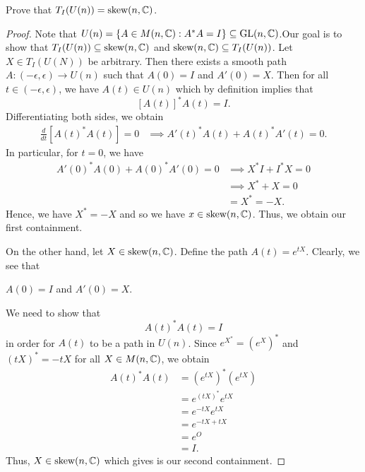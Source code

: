 \documentclass{article}
\begin{document}
\begin{problem}
    Prove that \( {T}_{I}(U(n))  = \text{skew}(n,\mathbb{C}) \).
\end{problem}
\begin{proof}
Note that \( U(n) = \{  A \in M(n,\mathbb{C}) : A^{*} A = I   \} \subseteq \text{GL}(n,\mathbb{C})    \).Our goal is to show that \( {T}_{I}(U(n)) \subseteq \text{skew}(n,\mathbb{C})  \) and \( \text{skew}(n,\mathbb{C}) \subseteq {T}_{I}(U(n))  \). Let \( X \in {T}_{I}(U(N)) \) be arbitrary. Then there exists a smooth path \( A : (- \epsilon, \epsilon) \to U(n) \) such that \( A(0) = I  \) and \( A'(0) = X  \). Then for all \( t \in (- \epsilon , \epsilon ) \), we have \( A(t) \in U(n) \) which by definition implies that 
\[  [A(t)]^{*}  A(t) = I.  \]
Differentiating both sides, we obtain
\begin{align*}
    \frac{ d }{ dt  } [A(t)^{*} A(t)] = 0 &\implies A'(t)^{*} A(t) + A(t)^{*} A'(t) = 0  .
\end{align*}
In particular, for \( t = 0  \), we have 
\begin{align*}
    A'(0)^{*} A(0) + A(0)^{*} A'(0) = 0  &\implies X^{*} I  + I^{*} X = 0  \\
                                         &\implies X^{*} + X = 0  \\
                                         &= X^{*} = -X. 
\end{align*}
Hence, we have \( X^{*} = -X  \) and so we have \( x \in \text{skew}(n,\mathbb{C})  \). Thus, we obtain our first containment.

On the other hand, let \( X \in \text{skew}(n,\mathbb{C})  \). Define the path \( A(t) = e^{tX} \). Clearly, we see that 
\begin{center}
    \( A(0) = I  \) and \( A'(0) =  X \).
\end{center}
We need to show that 
\[  A(t)^{*} A(t) = I  \]
in order for \( A(t) \) to be a path in \( U(n) \). Since \( e^{X^{*}} = (e^{X})^{*}  \) and \( (tX)^{*} = - t X  \) for all \( X \in M(n,\mathbb{C}) \), we obtain 
\begin{align*}
    A(t)^{*} A(t) &= (e^{tX})^{*} (e^{tX})  \\
                  &= e^{(tX)^{*}} e^{tX} \\
                  &= e^{-tX} e^{tX} \\
                  &= e^{-tX + tX} \\
                  &= e^{O} \\
                  &= I.
\end{align*}
Thus, \( X \in \text{skew}(n,\mathbb{C})  \) which gives is our second containment.
\end{proof}
\end{document}
